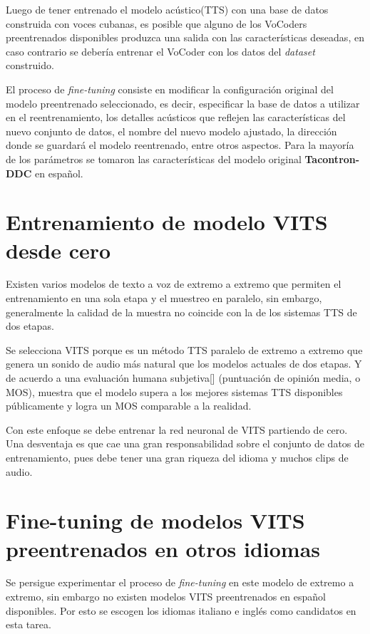 Luego de tener entrenado el modelo acústico(TTS) con una base de datos construida con voces cubanas, es posible que alguno de los VoCoders preentrenados disponibles produzca una salida con las características deseadas, en caso contrario se debería entrenar el VoCoder con los datos del \textit{dataset} construido.


El proceso de \textit{fine-tuning} consiste en modificar la configuración original del modelo preentrenado seleccionado, es decir, especificar la base de datos a utilizar en el reentrenamiento, los detalles acústicos que reflejen las características del nuevo conjunto de datos, el nombre del nuevo modelo ajustado, la dirección donde se guardará el modelo reentrenado, entre otros aspectos. Para la mayoría de los parámetros se tomaron las características del modelo original \textbf{Tacontron-DDC} en español.


\section{Entrenamiento de modelo VITS desde cero}

Existen varios modelos de texto a voz de extremo a extremo que permiten el entrenamiento en una sola etapa y el muestreo en paralelo, sin embargo, generalmente la calidad de la muestra no coincide con la de los sistemas TTS de dos etapas. 

Se selecciona VITS porque es un método TTS paralelo de extremo a extremo que genera un sonido de audio más natural que los modelos actuales de dos etapas. Y de acuerdo a una evaluación humana subjetiva[\cite{mos}] (puntuación de opinión media, o MOS), muestra que el modelo supera a los mejores sistemas TTS disponibles públicamente y logra un MOS comparable a la realidad.

Con este enfoque se debe entrenar la red neuronal de VITS partiendo de cero. Una desventaja es que cae una gran responsabilidad sobre el conjunto de datos de entrenamiento, pues debe tener una gran riqueza del idioma y muchos clips de audio.
	
	
\section{Fine-tuning de modelos VITS preentrenados en otros idiomas}

Se persigue experimentar el proceso de \textit{fine-tuning} en este modelo de extremo a extremo, sin embargo no existen modelos VITS preentrenados en español disponibles. Por esto se escogen los idiomas italiano e inglés como candidatos en esta tarea.

